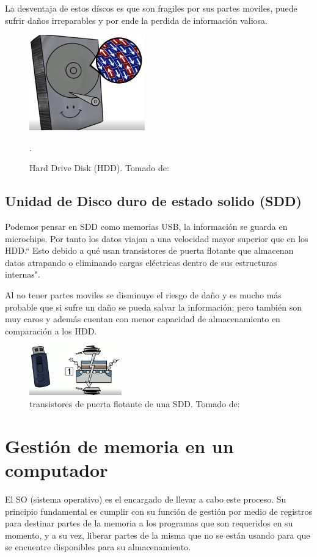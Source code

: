 \documentclass{article}
\begin{document}
La desventaja de estos díscos es que son fragiles por sus partes moviles, puede sufrir daños irreparables y por ende la perdida de información valiosa.

\begin{figure}[h]
\includegraphics[width=5cm]{HDD.PNG}
\centering
\caption{Hard Drive Disk (HDD). \centering Tomado de: \cite{TEDwebsite}}.
\label{HDD.PNG}
\end{figure}
\subsection{Unidad de Disco duro de estado solido (SDD)}
Podemos pensar en SDD como memorias USB, la información se guarda en microchips. Por tanto los datos viajan a una velocidad mayor superior que en los HDD.`` Esto debido a qué usan transistores de puerta flotante que almacenan datos atrapando o eliminando cargas eléctricas dentro de sus estructuras internas"\cite[How computer memory works. 3:42]{TEDwebsite}.

Al no tener partes moviles se disminuye el riesgo de daño y es mucho más probable que si sufre un daño se pueda salvar la información; pero también son muy caros y además cuentan con menor capacidad de almacenamiento en comparación a los HDD.
\begin{figure}[h]
\includegraphics[width=4cm]{SDD.PNG}
\centering
\caption{transistores de puerta flotante de una SDD. Tomado de:\cite{TEDwebsite}}
\label{SDD.PNG}
\end{figure}
\newpage
\section{Gestión de memoria en un computador}
 El SO (sistema operativo) es el encargado de llevar a cabo este proceso. Su principio fundamental es cumplir con su función de gestión por medio de registros para destinar partes de la memoria a los programas que son requeridos en su momento, y a su vez, liberar partes de la misma que no se están usando para que se encuentre disponibles para su almacenamiento. 
\vspace{0.2cm}
\end{document}
